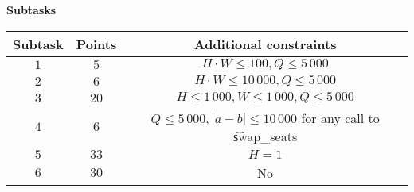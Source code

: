 \bf{Subtasks}

\begin{tabular}{|c|c|c|} \hline
\bf{Subtask}&\bf{Points}&\bf{Additional constraints}\\\hline
$1$&$5$& $ H \cdot W \le 100, Q \le 5\,000 $ \\\hline
$2$&$6$& $ H \cdot W \le 10\,000, Q \le 5\,000 $ \\\hline
$3$&$20$& $ H \le 1\,000, W \le 1\,000, Q \le 5\,000 $ \\\hline
$4$&$6$& $ Q \le 5\,000, |a-b| \le 10\,000 $ for any call to \t{swap_seats}\\\hline
$5$&$33$& $ H=1 $ \\\hline
$6$&$30$& No  \\\hline
\end{tabular}
